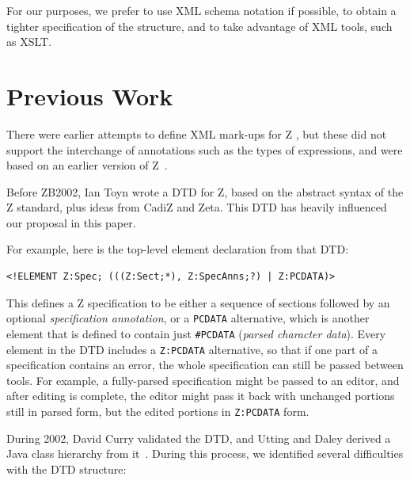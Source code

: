 \documentclass{llncs}  %
\newcommand{\AFont}[1]{\texttt{#1}}
\begin{document}
For our purposes, we prefer to use XML schema notation if possible,
to obtain a tighter specification of the structure, and to take
advantage of XML tools, such as XSLT.


\section{Previous Work}

There were earlier attempts to define XML mark-ups for Z
\cite{Dong01,Wordsworth99,ZEVES???}, but these did not support the
interchange of annotations such as the types of expressions,
and were based on an earlier version of Z~\cite{spivey:z-notation2}.

Before ZB2002, Ian Toyn wrote a DTD for Z, based on the abstract
syntax of the Z standard, plus ideas from CadiZ and Zeta.  This
DTD has heavily influenced our proposal in this paper.

For example, here is the top-level element declaration from that DTD:
\begin{small}
\begin{verbatim}
<!ELEMENT Z:Spec; (((Z:Sect;*), Z:SpecAnns;?) | Z:PCDATA)>
\end{verbatim}
\end{small}

This defines a Z specification to be either a sequence of sections
followed by an optional \emph{specification annotation}, or a
\AFont{PCDATA} alternative, which is another element that is defined 
to contain just \verb!#PCDATA! (\textit{parsed character data}).
Every element in the DTD includes a \AFont{Z:PCDATA} alternative, so
that if one part of a specification contains an error, the whole
specification can still be passed between tools.  For example,
a fully-parsed specification might be passed to an editor, and after
editing is complete, the editor might pass it back with unchanged
portions still in parsed form, but the edited portions in \AFont{Z:PCDATA}
form. 

During 2002, David Curry validated the DTD, and Utting and Daley
derived a Java class hierarchy from it~\cite{daley:report02}.
During this process, we identified several difficulties with the
DTD structure:
\end{document}
